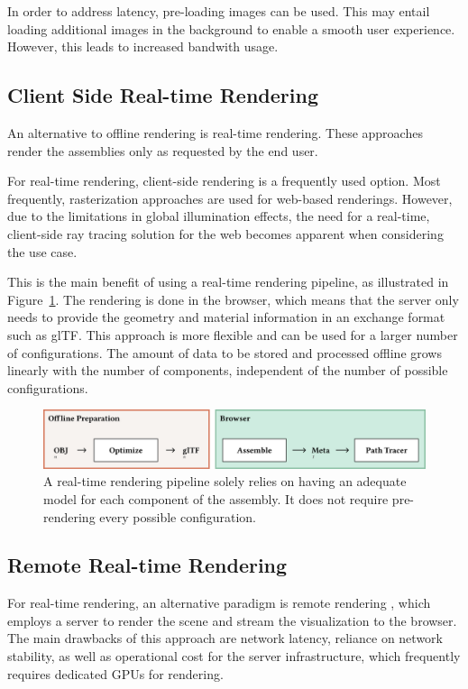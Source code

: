 In order to address latency, pre-loading images can be used. This may entail loading additional images in the background to enable a smooth user experience. However, this leads to increased bandwith usage.

\subsection*{Client Side Real-time Rendering}

An alternative to offline rendering is real-time rendering. These approaches render the assemblies only as requested by the end user.

For real-time rendering, client-side rendering is a frequently  used option. Most frequently, rasterization approaches are used for web-based renderings. However, due to the limitations in global illumination effects, the need for a real-time, client-side ray tracing solution for the web becomes apparent when considering the use case.

This is the main benefit of using a real-time rendering pipeline, as illustrated in Figure~\ref{fig:cad-online}. The rendering is done in the browser, which means that the server only needs to provide the geometry and material information in an exchange format such as glTF. This approach is more flexible and can be used for a larger number of configurations. The amount of data to be stored and processed offline grows linearly with the number of components, independent of the number of possible configurations.

\begin{figure}[H]
  \includegraphics[width=\columnwidth]{resources/cad-pipeline-online.png}
  \caption{A real-time rendering pipeline solely relies on having an adequate model for each component of the assembly. It does not require pre-rendering every possible configuration.}
  \label{fig:cad-online}
\end{figure}

\subsection*{Remote Real-time Rendering}

For real-time rendering, an alternative paradigm is remote rendering \cite{remoteRendering}, which employs a server to render the scene and stream the visualization to the browser. The main drawbacks of this approach are network latency, reliance on network stability, as well as operational cost for the server infrastructure, which frequently requires dedicated \glspl{GPU} for rendering.

